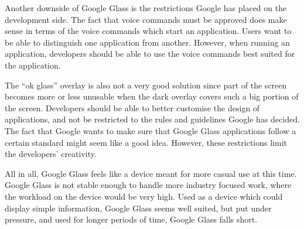 Another downside of Google Glass is the restrictions Google has placed on the development side. The fact that voice commands must be approved does make sense in terms of the voice commands which start an application. Users want to be able to distinguish one application from another. However, when running an application, developers should be able to use the voice commands best suited for the application.

The ``ok glass'' overlay is also not a very good solution since part of the screen becomes more or less unusable when the dark overlay covers such a big portion of the screen. Developers should be able to better customise the design of applications, and not be restricted to the rules and guidelines Google has decided. The fact that Google wants to make sure that Google Glass applications follow a certain standard might seem like a good idea. However, these restrictions limit the developers' creativity.

All in all, Google Glass feels like a device meant for more casual use at this time. Google Glass is not stable enough to handle more industry focused work, where the workload on the device would be very high. Used as a device which could display simple information, Google Glass seems well suited, but put under pressure, and used for longer periods of time, Google Glass falls short.





